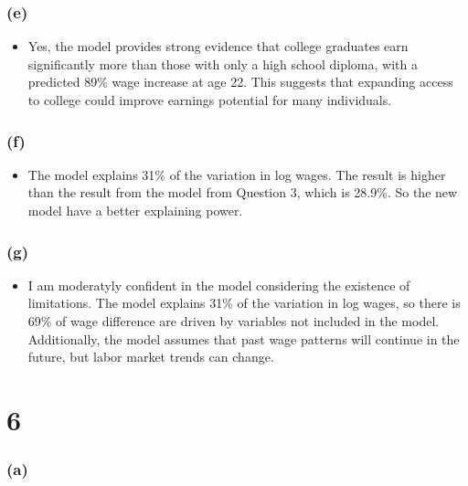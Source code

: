 \documentclass[
  letterpaper,
  DIV=11,
  numbers=noendperiod]{scrartcl}
\providecommand{\tightlist}{%
  \setlength{\itemsep}{0pt}\setlength{\parskip}{0pt}}\usepackage{longtable,booktabs,array}
\begin{document}
\subsubsection{(e)}\label{e-1}

\begin{itemize}
\tightlist
\item
  Yes, the model provides strong evidence that college graduates earn
  significantly more than those with only a high school diploma, with a
  predicted 89\% wage increase at age 22. This suggests that expanding
  access to college could improve earnings potential for many
  individuals.
\end{itemize}

\subsubsection{(f)}\label{f}

\begin{itemize}
\tightlist
\item
  The model explains 31\% of the variation in log wages. The result is
  higher than the result from the model from Question 3, which is
  28.9\%. So the new model have a better explaining power.
\end{itemize}

\subsubsection{(g)}\label{g}

\begin{itemize}
\tightlist
\item
  I am moderatyly confident in the model considering the existence of
  limitations. The model explains 31\% of the variation in log wages, so
  there is 69\% of wage difference are driven by variables not included
  in the model. Additionally, the model assumes that past wage patterns
  will continue in the future, but labor market trends can change.
\end{itemize}

\section{6}\label{section-6}

\subsubsection{(a)}\label{a-3}
\end{document}
